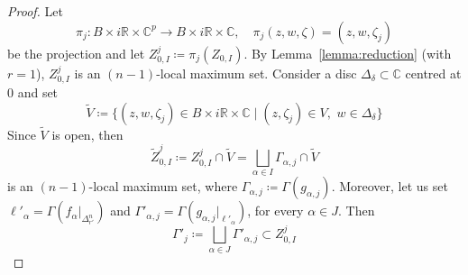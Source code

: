 \documentclass[reqno,oneside]{amsart}
\newcommand{\numberset}{\mathbb}
\newcommand{\R}{\numberset{R}}
\newcommand{\C}{\numberset{C}}
\theoremstyle{definition}
\theoremstyle{plain}
\theoremstyle{remark}
\begin{document}
\begin{proof}
    Let
    \[
        \pi_j:B\times i\R\times\C^p\to B\times i\R\times\C, \quad \pi_j(z,w,\zeta)=(z,w,\zeta_j)
    \]
    be the projection and let $Z_{0,I}^j\coloneqq\pi_j(Z_{0,I})$. By Lemma~\ref{lemma:reduction} (with $r=1$), $Z_{0,I}^j$ is an $(n-1)$-local maximum set. Consider a disc $\Delta_\delta\subset\C$ centred at 0 and set
    \[
        \tilde{V}\coloneqq\{(z,w,\zeta_j)\in B\times i\R\times\C \mid (z,\zeta_j)\in V, \,\, w\in\Delta_\delta\}
    \]
    Since $\tilde{V}$ is open, then
    \[
        \tilde{Z}_{0,I}^j\coloneqq Z_{0,I}^j\cap\tilde{V}=\bigsqcup_{\alpha\in I} \Gamma_{\alpha,j}\cap\tilde{V}
    \]
    is an $(n-1)$-local maximum set, where $\Gamma_{\alpha,j}\coloneqq\Gamma(g_{\alpha,j})$. Moreover, let us set $\ell'_\alpha=\Gamma(f_\alpha|_{\Delta_{r'}^n})$ and $\Gamma'_{\alpha,j}=\Gamma(g_{\alpha,j}|_{\ell'_\alpha})$, for every $\alpha\in J$. Then
    \[
        \Gamma'_j\coloneqq\bigsqcup_{\alpha\in J}\Gamma'_{\alpha,j}\subset Z_{0,I}^j
    \]
    

\end{proof}
\end{document}
